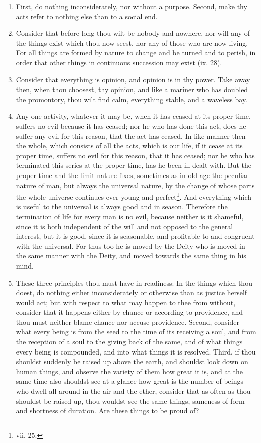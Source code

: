 \begin{enumerate}
\item First, do nothing inconsiderately, nor without a purpose. Second, make thy acts refer to nothing else than to a social end.

\item Consider that before long thou wilt be nobody and nowhere, nor will any of the things exist which thou now seest, nor any of those who are now living. For all things are formed by nature to change and be turned and to perish, in order that other things in continuous succession may exist (ix. 28).

\item Consider that everything is opinion, and opinion is in thy power. Take away then, when thou choosest, thy opinion, and like a mariner who has doubled the promontory, thou wilt find calm, everything stable, and a waveless bay.

\item Any one activity, whatever it may be, when it has ceased at its proper time, suffers no evil because it has ceased; nor he who has done this act, does he suffer any evil for this reason, that the act has ceased. In like manner then the whole, which consists of all the acts, which is our life, if it cease at its proper time, suffers no evil for this reason, that it has ceased; nor he who has terminated this series at the proper time, has he been ill dealt with. But the proper time and the limit nature fixes, sometimes as in old age the peculiar nature of man, but always the universal nature, by the change of whose parts the whole universe continues ever young and perfect\footnote{vii. 25.}. And everything which is useful to the universal is always good and in season. Therefore the termination of life for every man is no evil, because neither is it shameful, since it is both independent of the will and not opposed to the general interest, but it is good, since it is seasonable, and profitable to and congruent with the universal. For thus too he is moved by the Deity who is moved in the same manner with the Deity, and moved towards the same thing in his mind.

\item These three principles thou must have in readiness: In the things which thou doest, do nothing either inconsiderately or otherwise than as justice herself would act; but with respect to what may happen to thee from without, consider that it happens either by chance or according to providence, and thou must neither blame chance nor accuse providence. Second, consider what every being is from the seed to the time of its receiving a soul, and from the reception of a soul to the giving back of the same, and of what things every being is compounded, and into what things it is resolved. Third, if thou shouldst suddenly be raised up above the earth, and shouldst look down on human things, and observe the variety of them how great it is, and at the same time also shouldst see at a glance how great is the number of beings who dwell all around in the air and the ether, consider that as often as thou shouldst be raised up, thou wouldst see the same things, sameness of form and shortness of duration. Are these things to be proud of?


\end{enumerate}
